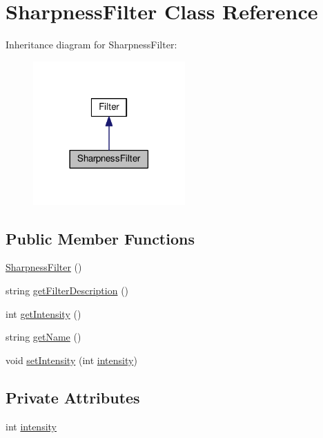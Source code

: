 \hypertarget{classModel_1_1SharpnessFilter}{}\section{Sharpness\+Filter Class Reference}
\label{classModel_1_1SharpnessFilter}


Inheritance diagram for Sharpness\+Filter\+:
\nopagebreak
\begin{figure}[H]
\begin{center}
\leavevmode
\includegraphics[width=165pt]{classModel_1_1SharpnessFilter__inherit__graph}
\end{center}
\end{figure}
\subsection*{Public Member Functions}
\begin{DoxyCompactItemize}
\item 
\hyperlink{classModel_1_1SharpnessFilter_a44befeabad12df3a52964999c9f2a140}{Sharpness\+Filter} ()
\item 
string \hyperlink{classModel_1_1SharpnessFilter_a62b7b60e24f92234393b840b35808e06}{get\+Filter\+Description} ()
\item 
int \hyperlink{classModel_1_1SharpnessFilter_a708995fb1b6acb31ee0dfb0f4881e5b5}{get\+Intensity} ()
\item 
string \hyperlink{classModel_1_1SharpnessFilter_a11335e13e50af74108bf926dc1340b4b}{get\+Name} ()
\item 
void \hyperlink{classModel_1_1SharpnessFilter_ac8255ffbc46bb61acaa8fd23d0d260eb}{set\+Intensity} (int \hyperlink{classModel_1_1SharpnessFilter_a299ec0c42ccc5a2d79d1739428ac3210}{intensity})
\end{DoxyCompactItemize}
\subsection*{Private Attributes}
\begin{DoxyCompactItemize}
\item 
int \hyperlink{classModel_1_1SharpnessFilter_a299ec0c42ccc5a2d79d1739428ac3210}{intensity}
\end{DoxyCompactItemize}
